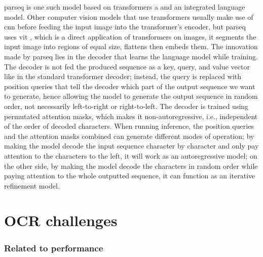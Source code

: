 \label{parseq}\gls{parseq} \cite{bautista_scene_2022} is one such model based on transformers a and an integrated language model. Other computer vision models that use transformers usually make use of \gls{cnn} before feeding the input image into the transformer's encoder, but \gls{parseq} uses \gls{vit} \cite{dosovitskiy_image_2021}, which is a direct application of transformers on images, it segments the input image into regions of equal size, flattens then embeds them. The innovation made by \gls{parseq} lies in the decoder that learns the language model while training. The decoder is not fed the produced sequence as a key, query, and value vector like in the standard transformer decoder; instead, the query is replaced with position queries that tell the decoder which part of the output sequence we want to generate, hence allowing the model to generate the output sequence in random order, not necessarily left-to-right or right-to-left. The decoder is trained using permutated attention masks, which makes it non-autoregressive, i.e., independent of the order of decoded characters. When running inference, the position queries and the attention masks combined can generate different modes of operation; by making the model decode the input sequence character by character and only pay attention to the characters to the left, it will work as an autoregressive model; on the other side, by making the model decode the characters in random order while paying attention to the whole outputted sequence, it can function as an iterative refinement model.

\section{OCR challenges} \label{ch:foundations:ocr_challenges}

\subsubsection*{Related to performance}

